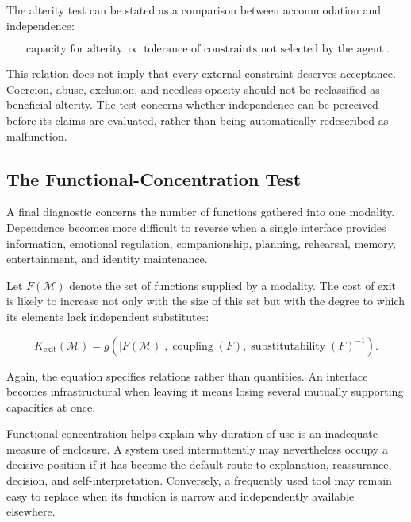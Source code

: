 \documentclass[11pt]{article}
\newcommand{\modality}{\mathcal{M}}
\begin{document}
The alterity test can be stated as a comparison between accommodation and
independence:

\begin{equation}
  \operatorname{capacity\ for\ alterity}
  \propto
  \operatorname{tolerance\ of\ constraints\ not\ selected\ by\ the\ agent}.
  \label{eq:alterity}
\end{equation}

This relation does not imply that every external constraint deserves
acceptance. Coercion, abuse, exclusion, and needless opacity should not be
reclassified as beneficial alterity. The test concerns whether independence
can be perceived before its claims are evaluated, rather than being
automatically redescribed as malfunction.

\subsection{The Functional-Concentration Test}

A final diagnostic concerns the number of functions gathered into one
modality. Dependence becomes more difficult to reverse when a single interface
provides information, emotional regulation, companionship, planning,
rehearsal, memory, entertainment, and identity maintenance.

Let \(F(\modality)\) denote the set of functions supplied by a modality. The
cost of exit is likely to increase not only with the size of this set but with
the degree to which its elements lack independent substitutes:

\begin{equation}
  K_{\mathrm{exit}}(\modality)
  =
  g\!\left(
    |F(\modality)|,
    \operatorname{coupling}(F),
    \operatorname{substitutability}(F)^{-1}
  \right).
  \label{eq:functional-concentration}
\end{equation}

Again, the equation specifies relations rather than quantities. An interface
becomes infrastructural when leaving it means losing several mutually
supporting capacities at once.

Functional concentration helps explain why duration of use is an inadequate
measure of enclosure. A system used intermittently may nevertheless occupy a
decisive position if it has become the default route to explanation,
reassurance, decision, and self-interpretation. Conversely, a frequently used
tool may remain easy to replace when its function is narrow and independently
available elsewhere.
\end{document}

